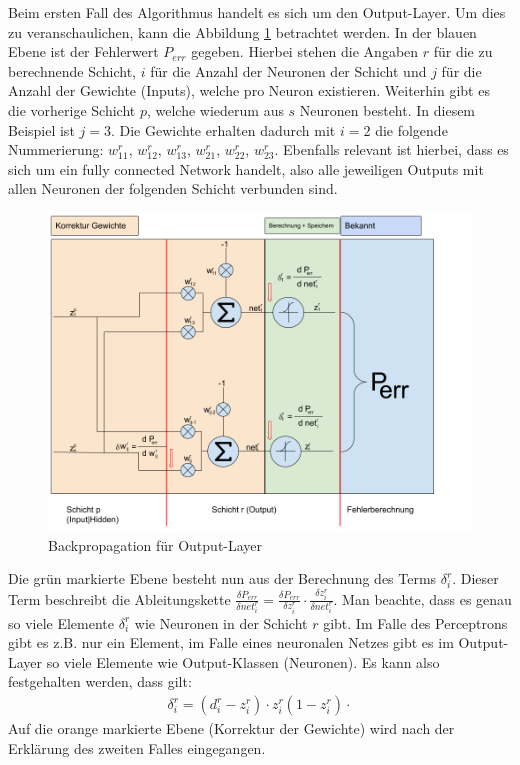 Beim ersten Fall des Algorithmus handelt es sich um den Output-Layer. Um dies zu veranschaulichen, kann
die Abbildung \ref{fig:08_backpropagation_output} betrachtet werden. In der blauen Ebene ist der Fehlerwert $P_{err}$
gegeben. Hierbei stehen die Angaben $r$ für die zu berechnende Schicht,
$i$ für die Anzahl der Neuronen der Schicht und $j$ für die Anzahl der Gewichte (Inputs), welche pro Neuron existieren.
Weiterhin gibt es die vorherige Schicht $p$, welche wiederum aus $s$ Neuronen besteht.
In diesem Beispiel ist $j = 3$. Die Gewichte erhalten dadurch mit $i = 2$ die folgende Nummerierung:
$w_{11}^r$, $w_{12}^r$, $w_{13}^r$, $w_{21}^r$, $w_{22}^r$, $w_{23}^r$. Ebenfalls relevant ist hierbei, dass es sich um ein \glqq fully connected
Network\grqq{} handelt, also alle jeweiligen Outputs mit allen Neuronen der folgenden Schicht verbunden sind.

\begin{figure}[h!]
    \begin{center}
        \includegraphics[width=1\linewidth]{../common/01_neuronal_network/00_resources/04_backpropagation_output.png}
    \end{center}
    \caption{Backpropagation für Output-Layer}
    \label{fig:08_backpropagation_output}
\end{figure}
Die grün markierte Ebene besteht nun aus der Berechnung des Terms $\delta_i^r$. Dieser Term beschreibt die Ableitungskette
$\frac{\delta P_{err}}{\delta net_i^r} = \frac{\delta P_{err}}{\delta z_i^r} \cdot \frac{\delta z_i^r}{\delta net_i^r}$.
Man beachte, dass es genau so viele Elemente $\delta_i^r$ wie Neuronen in der Schicht $r$ gibt.
Im Falle des Perceptrons gibt es z.B. nur ein Element, im Falle eines neuronalen Netzes gibt es im Output-Layer so viele Elemente wie
Output-Klassen (Neuronen).
Es kann also festgehalten werden, dass gilt:
\begin{align}
    \delta_i^r = (d_i^r - z_i^r) \cdot z_i^r(1 - z_i^r) \cdot \label{eq:04_delta_output}
\end{align}
Auf die orange markierte Ebene (Korrektur der Gewichte) wird nach der Erklärung des zweiten Falles eingegangen.

